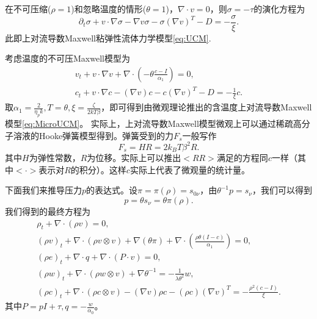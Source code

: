\documentclass{article}
\begin{document}
	在不可压缩($\rho=1$)和忽略温度的情形($\theta=1$)，$\nabla \cdot v = 0$，则$\sigma = -\tau$的演化方程为
	\begin{equation*}
		\partial_t \sigma + v \cdot \nabla \sigma - \nabla v \sigma - \sigma (\nabla v)^T - D = -\frac{\sigma}{\xi}. 
	\end{equation*}
	此即上对流导数Maxwell粘弹性流体力学模型\eqref{eq:UCM}.	

	考虑温度的不可压Maxwell模型为
	\begin{eqnarray} \label{eq:Tmaxwell}
		v_t + v \cdot \nabla v + \nabla \cdot (-\theta \frac{c-I}{\alpha_1}) = 0, \\
		c_t + v \cdot \nabla c - (\nabla v) c - c (\nabla v)^T - D = -\frac{1}{\xi} c.
	\end{eqnarray}
	取$\alpha_1 = \frac{2}{\eta_p k}, T = \theta,\xi = \frac{\zeta}{2 kT \beta}$，即可得到由微观理论推出的含温度上对流导数Maxwell模型\eqref{eq:MicroUCM}。	实际上，上对流导数Maxwell模型微观上可以通过稀疏高分子溶液的Hooke弹簧模型得到\cite{}。弹簧受到的力$F_s$一般写作
	\begin{equation*}
		F_s = H R = 2 k_B T \beta^2 R.
	\end{equation*}
	其中$H$为弹性常数，$R$为位移。实际上可以推出$<RR>$满足的方程同$c$一样（其中$<\cdot>$表示对$R$的积分）。这样$c$实际上代表了微观量的统计量。

	下面我们来推导压力$p$的表达式。设$\pi= \pi(\rho) = s_{0\nu}$，由$\theta^{-1} p = s_\nu$，我们可以得到
	\begin{equation*}
		p = \theta s_\nu = \theta \pi(\rho) . 
	\end{equation*}
	我们得到的最终方程为
	\begin{subequations}
		\begin{align*}
			\rho_t + \nabla \cdot (\rho v) = 0 ,\\
			(\rho v)_t + \nabla \cdot (\rho v \otimes v) + \nabla (\theta \pi)  + \nabla \cdot ( \frac{\rho \theta(I-c)}{\alpha_1}) =0 ,\\
			(\rho e)_t + \nabla \cdot q + \nabla \cdot (P \cdot v) = 0, \\
			(\rho w)_t + \nabla \cdot (\rho w \otimes v) + \nabla \theta^{-1} = -\frac{1}{\lambda \theta^2} w, \\
			(\rho c)_t +  \nabla \cdot (\rho c \otimes v) - (\nabla v) \rho c - (\rho c) (\nabla v)^T  = -\frac{\rho^2 (c-I) }{\xi}.
		\end{align*}
	\end{subequations}
	其中$P = pI + \tau,q =-\frac{w}{\alpha_0}$。
\end{document}
